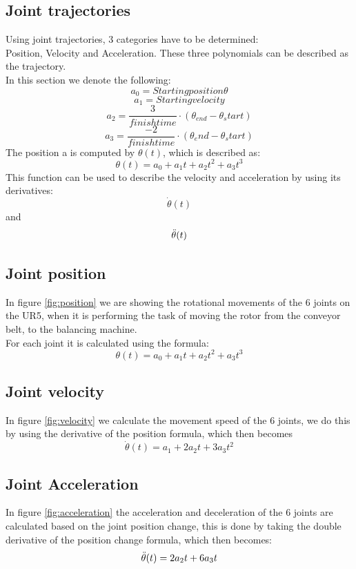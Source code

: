 \subsection{Joint trajectories}

Using joint trajectories, 3 categories have to be determined:\\
Position, Velocity and Acceleration.
These three polynomials can be described as the trajectory.\\
In this section we denote the following:
\begin{equation}
    a_0 = Starting position \theta
\end{equation}
\begin{equation}
    a_1 = Starting velocity
\end{equation}
\begin{equation}
    a_2 = \frac{3}{finish time} \cdot (\theta_{end} - \theta_start)
\end{equation}
\begin{equation}
    a_3 = \frac{-2}{finish time} \cdot (\theta_end - \theta_start)
\end{equation}
The position a is computed by \(\theta(t)\), which is described as: \[\theta(t)=a_0+a_1t+a_2t^2+a_3t^3\]
This function can be used to describe the velocity and acceleration by using its derivatives\cite{JointTrajectories}:\[\Dot{\theta}(t)\] and \[\Ddot{\theta}(t)\]

\subsection{Joint position}
In figure \ref{fig:position} we are showing the rotational movements of the 6 joints on the UR5, when it is performing the task of moving the rotor from the conveyor belt, to the balancing machine.\\
For each joint it is calculated using the formula: \[\theta(t)=a_0+a_1t+a_2t^2+a_3t^3\]

\subsection{Joint velocity}
In figure \ref{fig:velocity} we calculate the movement speed of the 6 joints, we do this by using the derivative of the position formula, which then becomes \[\Dot{\theta}(t)=a_1+2a_2t+3a_3t^2\]

\subsection{Joint Acceleration}
In figure \ref{fig:acceleration} the acceleration and deceleration of the 6 joints are calculated based on the joint position change, this is done by taking the double derivative of the position change formula, which then becomes: \[\Ddot{\theta}(t)=2a_2t+6a_3t\]


